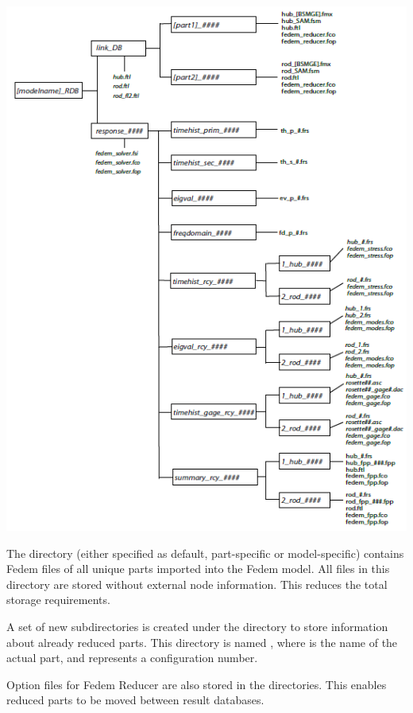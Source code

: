 \noindent\hspace{-12mm}
\includegraphics[height=\textheight]{Figures/8-RDB_DirectoryStructure}


\def\Hashes{\#\#\#\#}

The  directory (either specified as default, part-specific or
model-specific) contains Fedem  files of all unique parts imported
into the Fedem model. All  files in this directory are stored
without external node information. This reduces the total storage requirements.

A set of new subdirectories is created under the  directory to
store information about already reduced parts. This directory is named
\File{[partname]\_\Hashes}, where \File{[partname]} is the name of
the actual part, and \File{\Hashes} represents a configuration number.

Option files for Fedem Reducer are also stored in the \File{[partname]\_\Hashes}
directories. This enables reduced parts to be moved between result databases.


